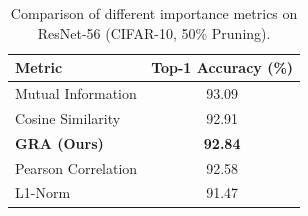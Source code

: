 \begin{table}[h]
\centering
\caption{Comparison of different importance metrics on ResNet-56 (CIFAR-10, 50\% Pruning).}
\label{tab:comparative_metrics}
\begin{tabular}{lc}
\toprule
Metric & Top-1 Accuracy (\%) \\
\midrule
Mutual Information & 93.09 \\
Cosine Similarity & 92.91 \\
\textbf{GRA (Ours)} & \textbf{92.84} \\
Pearson Correlation & 92.58 \\
L1-Norm & 91.47 \\
\bottomrule
\end{tabular}
\end{table}